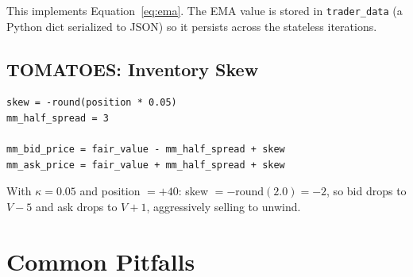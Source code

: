 \documentclass[11pt, letterpaper]{article}
\begin{document}
This implements Equation~\ref{eq:ema}. The EMA value is stored in \texttt{trader\_data} (a Python dict serialized to JSON) so it persists across the stateless iterations.

\subsection{TOMATOES: Inventory Skew}

\begin{lstlisting}[caption={Position-based quote adjustment.}]
skew = -round(position * 0.05)
mm_half_spread = 3

mm_bid_price = fair_value - mm_half_spread + skew
mm_ask_price = fair_value + mm_half_spread + skew
\end{lstlisting}

With $\kappa = 0.05$ and position $= +40$: skew $= -\text{round}(2.0) = -2$, so bid drops to $V - 5$ and ask drops to $V + 1$, aggressively selling to unwind.


\section{Common Pitfalls}
\end{document}
